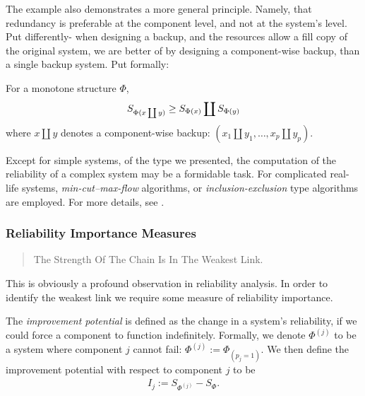 The example also demonstrates a more general principle. Namely, that redundancy is preferable at the component level, and not at the system's level.
Put differently- when designing a backup, and the resources allow a fill copy of the original system, we are better of by designing a component-wise backup, than a single backup system.
Put formally:
\begin{theorem}
For a monotone structure $\Phi$, 
\begin{align}
	S_{\Phi(x \coprod y)} \geq S_{\Phi(x)} \coprod S_{\Phi(y)}
\end{align}
where $x \coprod y$ denotes a component-wise backup: $(x_1 \coprod y_1,\dots,x_p \coprod y_p)$.
\end{theorem}



\begin{extra}
Except for simple systems, of the type we presented, the computation of the reliability of a complex system may be a formidable task. 
For complicated real-life systems, \emph{min-cut--max-flow} algorithms, or \emph{inclusion-exclusion} type algorithms are employed. 
For more details, see \cite{aven_stochastic_1999}.
\end{extra}









\subsubsection{Reliability Importance Measures}
\begin{quotation}
The Strength Of The Chain Is In The Weakest Link.
\end{quotation}
This is obviously a profound observation in reliability analysis.
In order to identify the weakest link we require some measure of reliability importance.


\begin{definition}
The \emph{improvement potential} is defined as the change in a system's reliability, if we could force a component to function indefinitely.
Formally, we denote $\Phi^{(j)}$ to be a system where component $j$ cannot fail: $\Phi^{(j)}:=\Phi_{(p_j=1)}$.
We then define the improvement potential with respect to component $j$ to be 
\begin{align}
	I_j :=S_{\Phi^{(j)}}-S_{\Phi}.
\end{align}
\end{definition}



